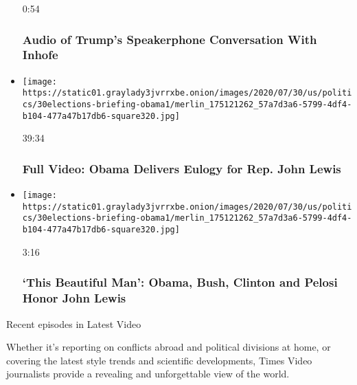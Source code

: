 \begin{itemize}
  0:54

  \hypertarget{audio-of-trumps-speakerphone-conversation-with-inhofe}{%
  \subsubsection{Audio of Trump's Speakerphone Conversation With
  Inhofe}\label{audio-of-trumps-speakerphone-conversation-with-inhofe}}
\item
  \href{https://www.nytimes3xbfgragh.onion/video/us/100000007264733/obama-john-lewis-funeral.html?action=click\&module=video-series-bar\&region=header\&pgtype=Article\&playlistId=video/latest-video}{}

  \texttt{[image: https://static01.graylady3jvrrxbe.onion/images/2020/07/30/us/politics/30elections-briefing-obama1/merlin\_175121262\_57a7d3a6-5799-4df4-b104-477a47b17db6-square320.jpg]}

  39:34

  \hypertarget{full-video-obama-delivers-eulogy-for-rep-john-lewis}{%
  \subsubsection{Full Video: Obama Delivers Eulogy for Rep. John
  Lewis}\label{full-video-obama-delivers-eulogy-for-rep-john-lewis}}
\item
  \href{https://www.nytimes3xbfgragh.onion/video/us/politics/100000007264823/john-lewis-funeral.html?action=click\&module=video-series-bar\&region=header\&pgtype=Article\&playlistId=video/latest-video}{}

  \texttt{[image: https://static01.graylady3jvrrxbe.onion/images/2020/07/30/us/politics/30elections-briefing-obama1/merlin\_175121262\_57a7d3a6-5799-4df4-b104-477a47b17db6-square320.jpg]}

  3:16

  \hypertarget{this-beautiful-man-obama-bush-clinton-and-pelosi-honor-john-lewis}{%
  \subsubsection{`This Beautiful Man': Obama, Bush, Clinton and Pelosi
  Honor John
  Lewis}\label{this-beautiful-man-obama-bush-clinton-and-pelosi-honor-john-lewis}}
\end{itemize}

Recent episodes in Latest Video

Whether it's reporting on conflicts abroad and political divisions at
home, or covering the latest style trends and scientific developments,
Times Video journalists provide a revealing and unforgettable view of
the world.

